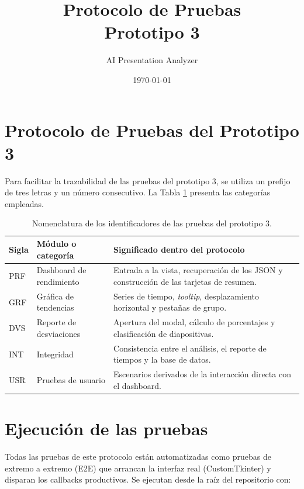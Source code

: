 \documentclass[12pt,letterpaper]{article}
\title{\textbf{Protocolo de Pruebas\\[0.3em]Prototipo 3}}
\author{AI Presentation Analyzer}
\date{\today}
\begin{document}
\maketitle

\section*{Protocolo de Pruebas del Prototipo 3}

Para facilitar la trazabilidad de las pruebas del prototipo 3, se utiliza un prefijo de tres letras y un número consecutivo. La Tabla \ref{tab:nomenclatura-pruebas-prototipo-3} presenta las categorías empleadas.

\begin{table}[H]
\centering
\renewcommand{\arraystretch}{1.2}
\begin{tabularx}{\textwidth}{|>{\centering\arraybackslash}p{1.5cm}|p{4.6cm}|X|}
\hline
\textbf{Sigla} & \textbf{Módulo o categoría} & \textbf{Significado dentro del protocolo} \\ \hline
PRF & Dashboard de rendimiento & Entrada a la vista, recuperación de los JSON y construcción de las tarjetas de resumen. \\ \hline
GRF & Gráfica de tendencias & Series de tiempo, \textit{tooltip}, desplazamiento horizontal y pestañas de grupo. \\ \hline
DVS & Reporte de desviaciones & Apertura del modal, cálculo de porcentajes y clasificación de diapositivas. \\ \hline
INT & Integridad & Consistencia entre el análisis, el reporte de tiempos y la base de datos. \\ \hline
USR & Pruebas de usuario & Escenarios derivados de la interacción directa con el dashboard. \\ \hline
\end{tabularx}
\caption{Nomenclatura de los identificadores de las pruebas del prototipo 3.}
\label{tab:nomenclatura-pruebas-prototipo-3}
\end{table}

\section*{Ejecución de las pruebas}

Todas las pruebas de este protocolo están automatizadas como pruebas de extremo a extremo (E2E) que arrancan la interfaz real (CustomTkinter) y disparan los callbacks productivos. Se ejecutan desde la raíz del repositorio con:
\end{document}

